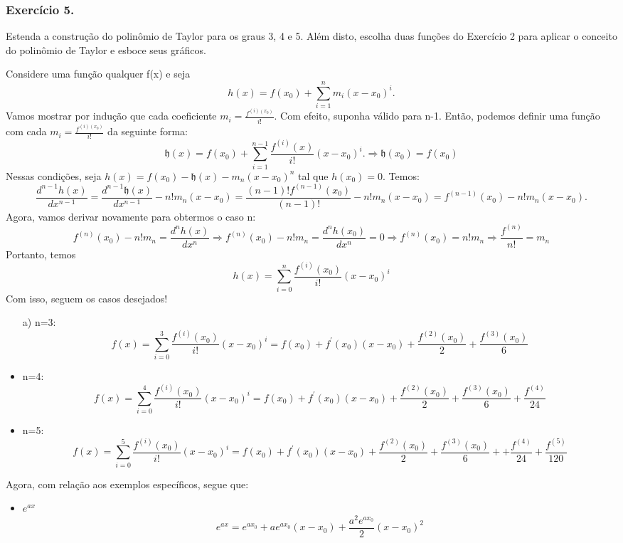\subsubsection{Exerc\'icio 5.}
Estenda a constru\c c\~ao do polin\^omio de Taylor para os graus 3, 4 e 5. Al\'em
disto, escolha duas fun\c c\~oes do Exerc\'icio 2 para aplicar o conceito do polin\^omio
de Taylor e esboce seus gr\'aficos.
\begin{proof*}
	Considere uma fun\c c\~ao qualquer f(x) e seja
	\[
		h(x) = f(x_{0}) + \sum_{i=1}^{n}m_{i}(x-x_{0})^{i}.
	\]
	Vamos mostrar por indu\c c\~ao que cada coeficiente
	$m_{i}= \frac{f^{(i)(x_0)}}{i!}$. Com efeito, suponha v\'alido para n-1. Ent\~ao,
	podemos definir uma fun\c c\~ao com cada $m_{i}= \frac{f^{(i)(x_0)}}{i!}$ da
	seguinte forma:
	\[
		\mathfrak{h}(x) = f(x_{0}) + \sum_{i=1}^{n-1}\frac{f^{(i)}(x)}{i!}(x-x_{0})^{i}. \Rightarrow \mathfrak{h}(x_{0}) = f(x_{0})
	\]
	Nessas condi\c c\~oes, seja $h(x) = f(x_{0}) - \mathfrak{h}(x) - m_{n}(x-x_{0})
	^{n}$ tal que $h(x_{0}) = 0$. Temos:
	\[
		\frac{d^{n-1}h(x)}{dx^{n-1}}= \frac{d^{n-1}\mathfrak{h}(x)}{dx^{n-1}}- n!m_{n}(x-x_{0}) = \frac{(n-1)!f^{(n-1)}(x_{0})}{(n-1)!}- n!m_{n}(x-x_{0}) = f^{(n-1)}(x_{0}) - n!m_{n}(x-x_{0}).
	\]
	Agora, vamos derivar novamente para obtermos o caso n:
	\[
		f^{(n)}(x_{0}) - n!m_{n}= \frac{d^{n}h(x)}{dx^{n}}\Rightarrow f^{(n)}(x_{0}) - n!m_{n}= \frac{d^{n}h(x_{0})}{dx^{n}}= 0 \Rightarrow f^{(n)}(x_{0}) = n!m_{n}\Rightarrow \frac{f^{(n)}}{n!}= m_{n}
	\]
	Portanto, temos
	\[
		h(x) = \sum_{i=0}^{n}\frac{f^{(i)}(x_{0})}{i!}(x-x_{0})^{i}
	\]
	Com isso, seguem os casos desejados!
	\begin{itemize}
		\item[a)] n=3:
			\[
				f(x) = \sum_{i=0}^{3}\frac{f^{(i)}(x_{0})}{i!}(x-x_{0})^{i}= f(x_{0}) + f^{'}(x_{0})(x-x_{0}) + \frac{f^{(2)}(x_{0})}{2}+ \frac{f^{(3)}(x_{0})}{6}
			\]

		\item n=4:
			\[
				f(x) = \sum_{i=0}^{4}\frac{f^{(i)}(x_{0})}{i!}(x-x_{0})^{i}= f(x_{0}) + f^{'}(x_{0})(x-x_{0}) + \frac{f^{(2)}(x_{0})}{2}+ \frac{f^{(3)}(x_{0})}{6}+ \frac{f^{(4)}}{24}
			\]

		\item n=5:
			\[
				f(x) = \sum_{i=0}^{5}\frac{f^{(i)}(x_{0})}{i!}(x-x_{0})^{i}= f(x_{0}) + f^{'}(x_{0})(x-x_{0}) + \frac{f^{(2)}(x_{0})}{2}+ \frac{f^{(3)}(x_{0})}{6}+ + \frac{f^{(4)}}{24}+ \frac{f^{(5)}}{120}
			\]
	\end{itemize}
	Agora, com rela\c c\~ao aos exemplos espec\'ificos, segue que:
	\begin{itemize}
		\item $e^{ax}$
			\[
				e^{ax}= e^{ax_0}+ ae^{ax_0}(x-x_{0}) + \frac{a^{2}e^{ax_0}}{2}(x-x_{0})^{2}
			\]


\end{itemize}
\end{proof*}
